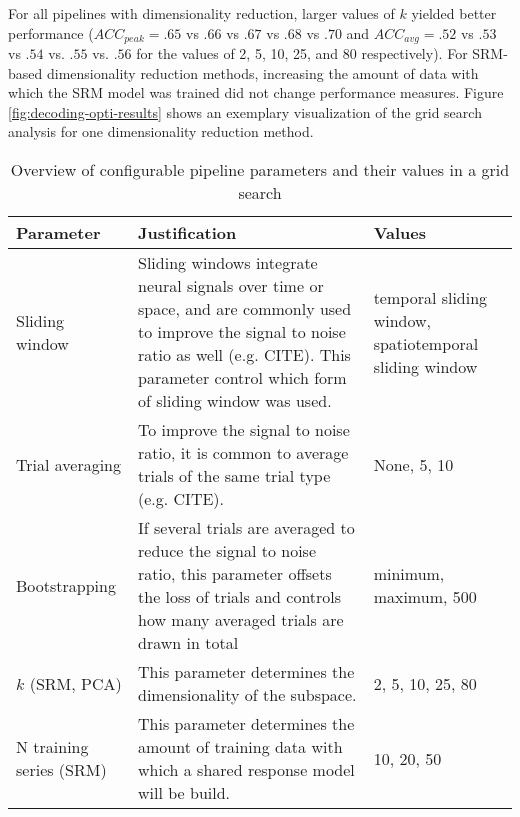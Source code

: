 For all pipelines with dimensionality reduction, larger values of $k$ yielded better performance ($ACC_{peak} = .65$ vs $.66$ vs $.67$ vs $.68$ vs $.70$ and $ACC_{avg} = .52$ vs $.53$ vs $.54$ vs. $.55$ vs. $.56$ for the values of 2, 5, 10, 25, and 80 respectively).
For \gls{SRM}-based dimensionality reduction methods, increasing the amount of data with which the \gls{SRM} model was trained did not change performance measures.
Figure \ref{fig:decoding-opti-results} shows an exemplary visualization of the grid search analysis for one dimensionality reduction method.


\begin{center}
	\begin{table}
		\begin{tabular}{ l p{} p{} }
			\hline
			\textbf{Parameter}	& \textbf{Justification} & \textbf{Values} 	 \\ \hline
			Sliding window 		& Sliding windows integrate neural signals over time or space, and are commonly used to improve the signal to noise ratio as well (e.g. CITE). This parameter control which form of sliding window was used. & temporal sliding window, spatiotemporal sliding window \\
			Trial averaging 	& To improve the signal to noise ratio, it is common to average trials of the same trial type (e.g. CITE). & None, 5, 10 \\
			Bootstrapping 		& If several trials are averaged to reduce the signal to noise ratio, this parameter offsets the loss of trials and controls how many averaged trials are drawn in total & minimum, maximum, 500 \\
			$k$ (SRM, PCA)		& This parameter determines the dimensionality of the subspace. & 2, 5, 10, 25, 80 	 \\
			N training series (SRM) & This parameter determines the amount of training data with which a shared response model will be build. 	& 10, 20, 50
		\end{tabular}
		\caption[Overview of pipeline parameters]{Overview of configurable pipeline parameters and their values in a grid search}
		\label{tab:gridsearch}
	\end{table}
\end{center}

